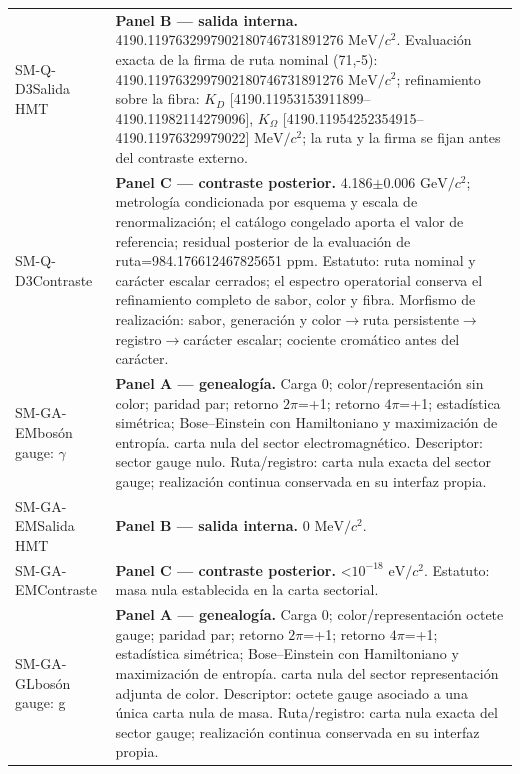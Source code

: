 \begin{longtable}{@{}>{\raggedright\arraybackslash}p{2.55cm}>{\raggedright\arraybackslash}p{11.75cm}@{}}
SM-Q-D3\newline Salida HMT & \textbf{Panel B --- salida interna. }4190.1197632997902180746731891276 \(\mathrm{MeV}/c^2\). Evaluación exacta de la firma de ruta nominal (71,-5): 4190.1197632997902180746731891276 \(\mathrm{MeV}/c^2\); refinamiento sobre la fibra: \(K_D\) [4190.11953153911899--4190.11982114279096], \(K_{\Omega}\) [4190.11954252354915--4190.11976329979022] \(\mathrm{MeV}/c^2\); la ruta y la firma se fijan antes del contraste externo. \\
SM-Q-D3\newline Contraste & \textbf{Panel C --- contraste posterior. }4.186\(\pm\)0.006 \(\mathrm{GeV}/c^2\); metrología condicionada por esquema y escala de renormalización; el catálogo congelado aporta el valor de referencia; residual posterior de la evaluación de ruta=984.176612467825651 ppm. Estatuto: ruta nominal y carácter escalar cerrados; el espectro operatorial conserva el refinamiento completo de sabor, color y fibra. Morfismo de realización: sabor, generación y color\(\to\)\allowbreak{}ruta persistente\(\to\)\allowbreak{}registro\(\to\)\allowbreak{}carácter escalar; cociente cromático antes del carácter. \\\addlinespace[2pt]
SM-GA-EM\newline bosón gauge: \(\gamma\) & \textbf{Panel A --- genealogía. }Carga 0; color/representación sin color; paridad par; retorno \(2\pi\)=+1; retorno \(4\pi\)=+1; estadística simétrica; Bose--Einstein con Hamiltoniano y maximización de entropía. carta nula del sector electromagnético. Descriptor: sector gauge nulo. Ruta/registro: carta nula exacta del sector gauge; realización continua conservada en su interfaz propia. \\
SM-GA-EM\newline Salida HMT & \textbf{Panel B --- salida interna. }0 \(\mathrm{MeV}/c^2\). \\
SM-GA-EM\newline Contraste & \textbf{Panel C --- contraste posterior. }<\(10^{-18}\) \(\mathrm{eV}/c^2\). Estatuto: masa nula establecida en la carta sectorial. \\\addlinespace[2pt]
SM-GA-GL\newline bosón gauge: g & \textbf{Panel A --- genealogía. }Carga 0; color/representación octete gauge; paridad par; retorno \(2\pi\)=+1; retorno \(4\pi\)=+1; estadística simétrica; Bose--Einstein con Hamiltoniano y maximización de entropía. carta nula del sector representación adjunta de color. Descriptor: octete gauge asociado a una única carta nula de masa. Ruta/registro: carta nula exacta del sector gauge; realización continua conservada en su interfaz propia. \\

\end{longtable}

